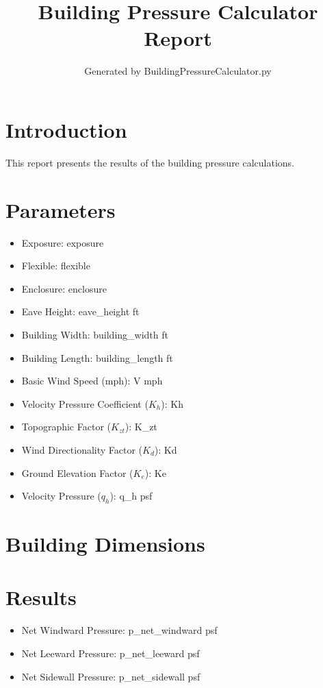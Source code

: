 \documentclass{article}
\title{Building Pressure Calculator Report}
\author{Generated by BuildingPressureCalculator.py}
\begin{document}
\maketitle

\section{Introduction}
This report presents the results of the building pressure calculations.

\section{Parameters}
\begin{itemize}
    \item Exposure: {{ exposure }}
    \item Flexible: {{ flexible }}
    \item Enclosure: {{ enclosure }}
    \item Eave Height: {{ eave_height }} ft
    \item Building Width: {{ building_width }} ft
    \item Building Length: {{ building_length }} ft
    \item Basic Wind Speed (mph): {{ V }} mph
    \item Velocity Pressure Coefficient ($K_h$): {{ Kh }}
    \item Topographic Factor ($K_{zt}$): {{ K_zt }}
    \item Wind Directionality Factor ($K_d$): {{ Kd }}
    \item Ground Elevation Factor ($K_e$): {{ Ke }}
    \item Velocity Pressure ($q_h$): {{ q_h }} psf
\end{itemize}

\section{Building Dimensions}

\section{Results}
\begin{itemize}
    \item Net Windward Pressure: {{ p_net_windward }} psf
    \item Net Leeward Pressure: {{ p_net_leeward }} psf
    \item Net Sidewall Pressure: {{ p_net_sidewall }} psf
\end{itemize}
\end{document}

